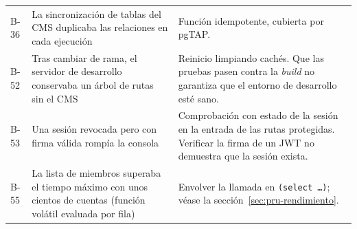 \begin{longtable}{@{}l>{\raggedright\arraybackslash}p{4.8cm}>{\raggedright\arraybackslash}p{7.4cm}@{}}
  B-36 & La sincronización de tablas del CMS duplicaba las relaciones en cada ejecución & Función idempotente, cubierta por pgTAP. \\
  B-52 & Tras cambiar de rama, el servidor de desarrollo conservaba un árbol de rutas sin el CMS & Reinicio limpiando cachés. Que las pruebas pasen contra la \textit{build} no garantiza que el entorno de desarrollo esté sano. \\
  B-53 & Una sesión revocada pero con firma válida rompía la consola & Comprobación con estado de la sesión en la entrada de las rutas protegidas. Verificar la firma de un JWT no demuestra que la sesión exista. \\
  B-55 & La lista de miembros superaba el tiempo máximo con unos cientos de cuentas (función volátil evaluada por fila) & Envolver la llamada en \texttt{(select \ldots)}; véase la sección~\ref{sec:pru-rendimiento}. \\
\end{longtable}
